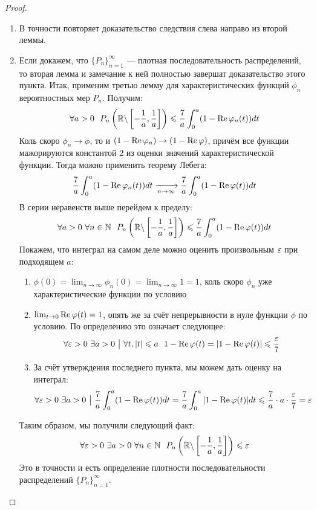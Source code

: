 \begin{proof}~
    \begin{enumerate}
        \item В точности повторяет доказательство следствия слева направо из второй леммы.
        \item Если докажем, что $\{P_n\}_{n = 1}^\infty$ --- плотная последовательность распределений, то вторая лемма и замечание к ней полностью завершат доказательство этого пункта. Итак, применим третью лемму для характеристических функций $\phi_n$ вероятностных мер $P_n$. Получим:
        \[
            \forall a > 0\ \ P_n \left(\mathbb{R} \backslash \left[-\frac{1}{a}, \frac{1}{a}\right]\right) \leqslant \frac{7}{a} \int_0^a (1 - \operatorname{Re}\varphi_n(t)) dt
        \]
        Коль скоро $\phi_n \to \phi$, то и $(1 - \operatorname{Re}\varphi_n) \to (1 - \operatorname{Re}\varphi)$, причём все функции мажорируются константой 2 из оценки значений характеристической функции. Тогда можно применить теорему Лебега:
        \[
            \frac{7}{a} \int_0^a (1 - \operatorname{Re}\varphi_n(t)) dt \xrightarrow[n \to \infty]{} \frac{7}{a} \int_0^a (1 - \operatorname{Re}\varphi(t))dt
        \]
        В серии неравенств выше перейдем к пределу:
        \[
            \forall a > 0\ \forall n \in \mathbb{N}\ \ P_n \left(\mathbb{R} \backslash \left[-\frac{1}{a}, \frac{1}{a}\right]\right) \leqslant \frac{7}{a} \int_0^a (1 - \operatorname{Re}\varphi(t))dt
        \]
        Покажем, что интеграл на самом деле можно оценить произвольным $\varepsilon$ при подходящем $a$:
        \begin{enumerate}
        	\item $\phi(0) = \lim_{n \to \infty} \phi_n(0) = \lim_{n \to \infty} 1 = 1$, коль скоро $\phi_n$ уже характеристические функции по условию
        	
        	\item $\lim_{t \to 0} \operatorname{Re}\varphi(t) = 1$, опять же за счёт непрерывности в нуле функции $\phi$ по условию. По определению это означает следующее:
        	\[
        		\forall \varepsilon > 0\ \exists a > 0 \ \big|\  \forall t, |t| \leqslant a\ \ 1 - \operatorname{Re}\varphi(t) = |1 - \operatorname{Re}\varphi(t)| \leqslant \frac{\varepsilon}{7}
        	\]
        	
        	\item За счёт утверждения последнего пункта, мы можем дать оценку на интеграл:
        	\[
        		\forall \varepsilon > 0\ \exists a > 0 \ \big|\  \frac{7}{a} \int_0^a (1 - \operatorname{Re}\varphi(t))dt = \frac{7}{a} \int_0^a |1 - \operatorname{Re}\varphi(t)|dt \leqslant \frac{7}{a} \cdot a \cdot \frac{\varepsilon}{7} = \varepsilon
        	\]
        \end{enumerate}
        Таким образом, мы получили следующий факт:
        \[
            \forall \varepsilon > 0\ \exists a > 0\ \forall n \in \mathbb{N} \ \ P_n\left(\mathbb{R} \backslash \left[-\frac{1}{a}, \frac{1}{a}\right]\right) \leqslant \varepsilon
        \]
        Это в точности и есть определение плотности последовательности распределений $\{P_n\}_{n = 1}^\infty$.
    \end{enumerate}
\end{proof}

